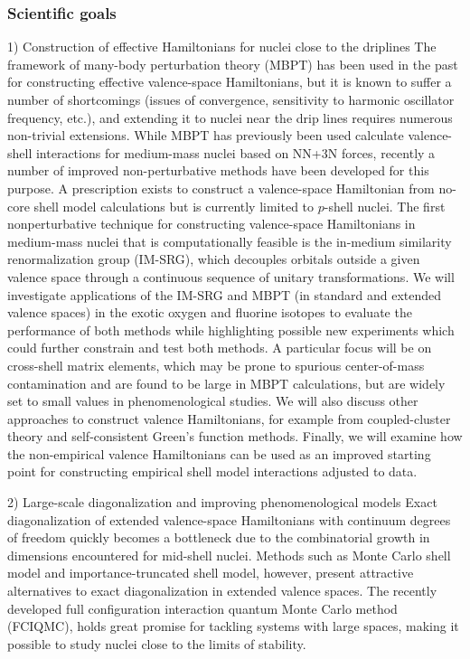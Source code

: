 \documentclass{beamer}
\begin{document}
\begin{frame}
\frametitle{Scientific goals}

\begin{block}{1) Construction of effective Hamiltonians for nuclei close to the driplines }
The framework of many-body perturbation theory (MBPT) has been used in the past 
for constructing effective valence-space Hamiltonians, but it is known to suffer a number of shortcomings (issues of convergence, sensitivity to harmonic oscillator frequency, etc.), and extending it to nuclei near the drip lines requires numerous non-trivial extensions. While MBPT has previously been used calculate 
valence-shell interactions for medium-mass nuclei based on NN+3N forces, 
recently a number of improved non-perturbative methods have been developed for this purpose.  A prescription exists to construct a valence-space Hamiltonian from no-core shell model 
calculations but is currently limited to $p$-shell nuclei.  The first 
nonperturbative technique for constructing valence-space Hamiltonians in 
medium-mass nuclei that is computationally feasible is the in-medium similarity 
renormalization group (IM-SRG), which decouples orbitals outside a given 
valence space through a continuous sequence of unitary transformations.  
We will investigate applications of the IM-SRG and MBPT (in standard and extended valence 
spaces) in the exotic oxygen and fluorine isotopes to evaluate the performance of both methods while highlighting possible new experiments which could further constrain and test both methods.  A particular focus will be on cross-shell matrix elements, which may be prone to spurious center-of-mass contamination and are found to 
be large in MBPT calculations, but are widely set to small values in 
phenomenological studies.  We will also discuss other approaches to construct valence Hamiltonians, for example from 
coupled-cluster theory and self-consistent Green's function methods. Finally, we will examine how the non-empirical valence Hamiltonians can be used as an improved starting point for constructing empirical shell model interactions adjusted to data.
\end{block}

\begin{block}{2) Large-scale diagonalization and improving phenomenological models  }
Exact diagonalization of extended valence-space Hamiltonians with continuum degrees of freedom quickly becomes a bottleneck due to the combinatorial growth in
dimensions encountered for mid-shell nuclei. Methods such as Monte Carlo shell model
and importance-truncated shell model, however, present attractive
alternatives to exact diagonalization in extended valence spaces.  The
recently developed full configuration interaction quantum Monte Carlo method (FCIQMC), holds great promise for tackling systems with large
spaces, making it possible to study nuclei close to the limits of
stability.


\end{block}
\end{frame}
\end{document}
